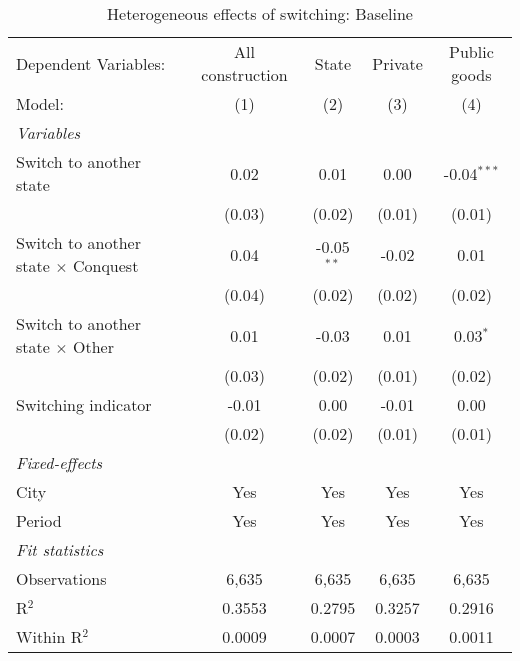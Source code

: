 \begin{table}[htbp]
   \caption{\label{tab:baseline_50y} Heterogeneous effects of switching: Baseline}
   \centering
   \begin{tabular}{lcccc}
      \tabularnewline \midrule \midrule
      Dependent Variables:                       & All construction & State        & Private & Public goods\\  
      Model:                                     & (1)              & (2)          & (3)     & (4)\\  
      \midrule
      \emph{Variables}\\
      Switch to another state                    & 0.02             & 0.01         & 0.00    & -0.04$^{***}$\\   
                                                 & (0.03)           & (0.02)       & (0.01)  & (0.01)\\   
      Switch to another state $\times$ Conquest  & 0.04             & -0.05$^{**}$ & -0.02   & 0.01\\   
                                                 & (0.04)           & (0.02)       & (0.02)  & (0.02)\\   
      Switch to another state $\times$ Other     & 0.01             & -0.03        & 0.01    & 0.03$^{*}$\\   
                                                 & (0.03)           & (0.02)       & (0.01)  & (0.02)\\   
      Switching indicator                        & -0.01            & 0.00         & -0.01   & 0.00\\   
                                                 & (0.02)           & (0.02)       & (0.01)  & (0.01)\\   
      \midrule
      \emph{Fixed-effects}\\
      City                                       & Yes              & Yes          & Yes     & Yes\\  
      Period                                     & Yes              & Yes          & Yes     & Yes\\  
      \midrule
      \emph{Fit statistics}\\
      Observations                               & 6,635            & 6,635        & 6,635   & 6,635\\  
      R$^2$                                      & 0.3553           & 0.2795       & 0.3257  & 0.2916\\  
      Within R$^2$                               & 0.0009           & 0.0007       & 0.0003  & 0.0011\\  
      \midrule \midrule
      

\end{tabular}
\end{table}
